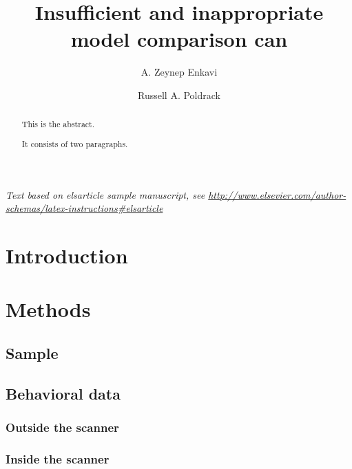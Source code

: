 \documentclass[]{elsarticle} %
\begin{document}
\begin{frontmatter}

  \title{Insufficient and inappropriate model comparison can}
    \author[California Institute of Technology]{A. Zeynep Enkavi}
    \author[Stanford University]{Russell A. Poldrack}
      \address[California Institute of Technology]{Division of Humanities and Social Sciences, 1200 E. California Blvd.,
Pasadena, CA, 91125}
    \address[Stanford University]{Department of Psychology, 450 Jane Stanford Way, Stanford, CA, 94305}
  
  \begin{abstract}
  This is the abstract.
  
  It consists of two paragraphs.
  \end{abstract}
  
 \end{frontmatter}

\emph{Text based on elsarticle sample manuscript, see
\url{http://www.elsevier.com/author-schemas/latex-instructions\#elsarticle}}

\hypertarget{introduction}{%
\section{Introduction}\label{introduction}}

\hypertarget{methods}{%
\section{Methods}\label{methods}}

\hypertarget{sample}{%
\subsection{Sample}\label{sample}}

\hypertarget{behavioral-data}{%
\subsection{Behavioral data}\label{behavioral-data}}

\hypertarget{outside-the-scanner}{%
\subsubsection{Outside the scanner}\label{outside-the-scanner}}

\hypertarget{inside-the-scanner}{%
\subsubsection{Inside the scanner}\label{inside-the-scanner}}
\end{document}
